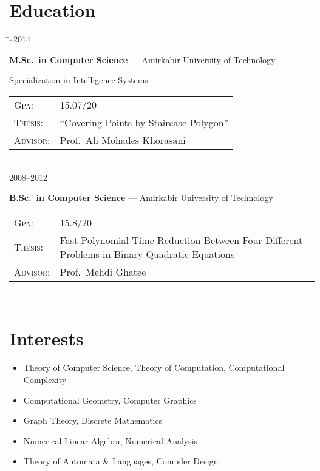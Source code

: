 \documentclass[a4paper,10pt]{article}
\newcommand{\follownote}[1]{--- {\footnotesize\color{darkblue}#1}}
\begin{document}
\section*{{\color{red}Education}}
\begin{tabbing}
\hspace{2.5cm}\=--2014 \>\parbox[t]{10.5cm}{
	\textbf{M.Sc.\ in Computer Science}
	\follownote{Amirkabir University of Technology}

	Specialization in Intelligence Systems

	\begin{tabular}{p{1.5cm}p{8cm}}
	\textsc{Gpa}: & 15.07/20 \\
	\textsc{Thesis}: & ``Covering Points by Staircase Polygon'' \\
	\textsc{Advisor}: & Prof.\ Ali Mohades Khorasani
	\end{tabular}
} \\[2mm]
2008--2012 \>\parbox[t]{10.5cm}{
	\textbf{B.Sc.\ in Computer Science}
	\follownote{Amirkabir University of Technology}

	\begin{tabular}{p{1.5cm}p{8cm}}
	\textsc{Gpa}: & 15.8/20 \\
	\textsc{Thesis}: & Fast Polynomial Time Reduction
	    Between Four Different Problems in Binary Quadratic
	    Equations \\
	\textsc{Advisor}: & Prof.\ Mehdi Ghatee
	\end{tabular}
} \\[2mm]
\end{tabbing}

\section*{{\color{blue}Interests}}
\begin{itemize}
	\item Theory of Computer Science, Theory of Computation,
	    Computational Complexity
	\item Computational Geometry, Computer Graphics
	\item Graph Theory, Discrete Mathematics
	\item Numerical Linear Algebra, Numerical Analysis
	\item Theory of Automata \& Languages, Compiler Design
\end{itemize}
\end{document}
